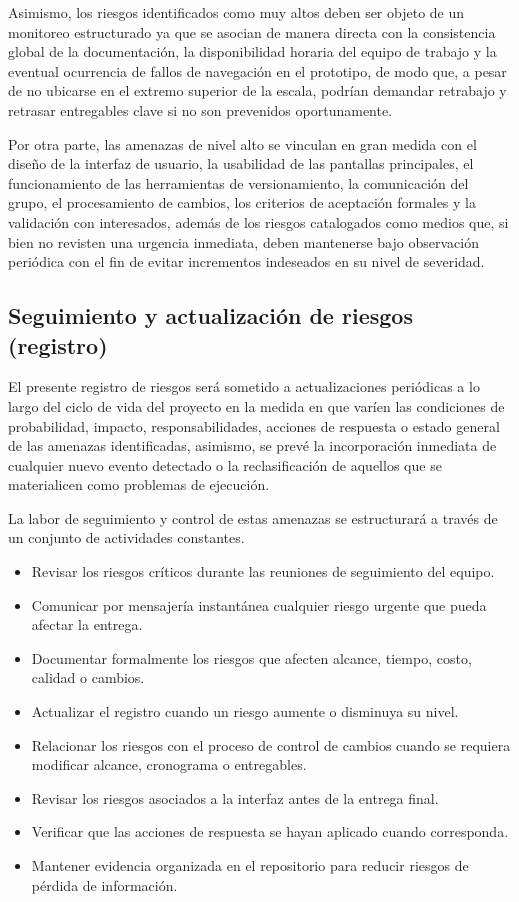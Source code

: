 \documentclass[11pt,spanish]{article}
\begin{document}
Asimismo, los riesgos identificados como muy altos deben ser objeto de un monitoreo estructurado ya que se asocian de manera directa con la consistencia global de la documentación, la disponibilidad horaria del equipo de trabajo y la eventual ocurrencia de fallos de navegación en el prototipo, de modo que, a pesar de no ubicarse en el extremo superior de la escala, podrían demandar retrabajo y retrasar entregables clave si no son prevenidos oportunamente.

Por otra parte, las amenazas de nivel alto se vinculan en gran medida con el diseño de la interfaz de usuario, la usabilidad de las pantallas principales, el funcionamiento de las herramientas de versionamiento, la comunicación del grupo, el procesamiento de cambios, los criterios de aceptación formales y la validación con interesados, además de los riesgos catalogados como medios que, si bien no revisten una urgencia inmediata, deben mantenerse bajo observación periódica con el fin de evitar incrementos indeseados en su nivel de severidad.

\subsection{Seguimiento y actualización de riesgos (registro)}

El presente registro de riesgos será sometido a actualizaciones periódicas a lo largo del ciclo de vida del proyecto en la medida en que varíen las condiciones de probabilidad, impacto, responsabilidades, acciones de respuesta o estado general de las amenazas identificadas, asimismo, se prevé la incorporación inmediata de cualquier nuevo evento detectado o la reclasificación de aquellos que se materialicen como problemas de ejecución.

La labor de seguimiento y control de estas amenazas se estructurará a través de un conjunto de actividades constantes.

\begin{itemize}[leftmargin=*, label={\textbullet}]
    \item Revisar los riesgos críticos durante las reuniones de seguimiento del equipo.
    \item Comunicar por mensajería instantánea cualquier riesgo urgente que pueda afectar la entrega.
    \item Documentar formalmente los riesgos que afecten alcance, tiempo, costo, calidad o cambios.
    \item Actualizar el registro cuando un riesgo aumente o disminuya su nivel.
    \item Relacionar los riesgos con el proceso de control de cambios cuando se requiera modificar alcance, cronograma o entregables.
    \item Revisar los riesgos asociados a la interfaz antes de la entrega final.
    \item Verificar que las acciones de respuesta se hayan aplicado cuando corresponda.
    \item Mantener evidencia organizada en el repositorio para reducir riesgos de pérdida de información.
\end{itemize}
\end{document}
